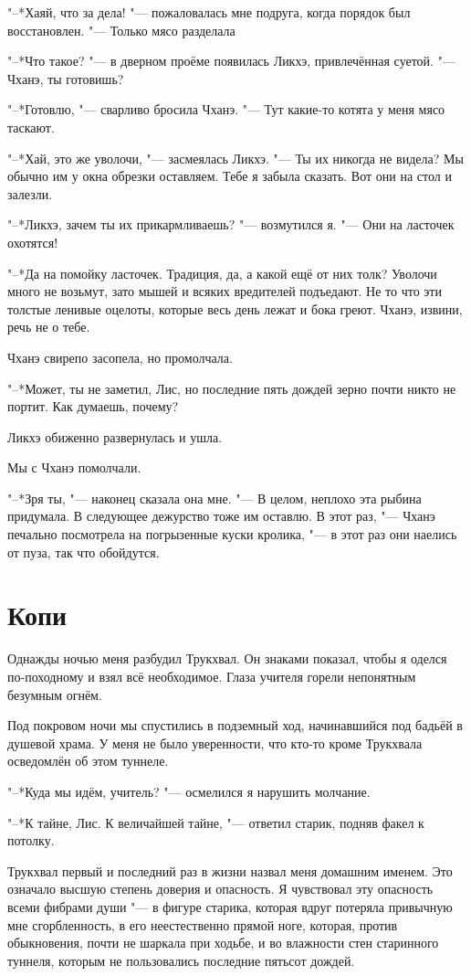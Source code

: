 \documentclass[a4paper,10pt]{book}
\newcommand{\ldotst}{\so{...}\xspace}
\newcommand{\ldotse}{\so{!..}\xspace}
\begin{document}
"--*Хаяй, что за дела! "--- пожаловалась мне подруга, когда порядок был 
восстановлен. "--- Только мясо разделала\ldotse

"--*Что такое? "--- в дверном проёме появилась Ликхэ, привлечённая суетой. "--- 
Чханэ, ты готовишь?

"--*Готовлю, "--- сварливо бросила Чханэ. "--- Тут какие-то котята у меня мясо 
таскают.

"--*Хай, это же уволочи, "--- засмеялась Ликхэ. "--- Ты их никогда не видела? 
Мы обычно им у окна обрезки оставляем. Тебе я забыла сказать. Вот они на стол и 
залезли.

"--*Ликхэ, зачем ты их прикармливаешь? "--- возмутился я. "--- Они на ласточек 
охотятся!

"--*Да на помойку ласточек. Традиция, да, а какой ещё от них толк? Уволочи 
много не возьмут, зато мышей и всяких вредителей подъедают. Не то что эти 
толстые ленивые оцелоты, которые весь день лежат и бока греют. Чханэ, извини, 
речь не о тебе.

Чханэ свирепо засопела, но промолчала.

"--*Может, ты не заметил, Лис, но последние пять дождей зерно почти никто не 
портит. Как думаешь, почему?

Ликхэ обиженно развернулась и ушла.

Мы с Чханэ помолчали.

"--*Зря ты, "--- наконец сказала она мне. "--- В целом, неплохо эта рыбина 
придумала. В следующее дежурство тоже им оставлю. В этот раз, "--- Чханэ 
печально посмотрела на погрызенные куски кролика, "--- в этот раз они наелись 
от пуза, так что обойдутся.
 
\section{Копи}
 
Однажды ночью меня разбудил Трукхвал. Он знаками показал, чтобы я оделся 
по-походному и взял всё необходимое. Глаза учителя горели непонятным безумным 
огнём.

Под покровом ночи мы спустились в подземный ход, начинавшийся под бадьёй в 
душевой храма. У меня не было уверенности, что кто-то кроме Трукхвала 
осведомлён об этом туннеле.

"--*Куда мы идём, учитель? "--- осмелился я нарушить молчание.

"--*К тайне, Лис. К величайшей тайне, "--- ответил старик, подняв факел к
потолку.

Трукхвал первый и последний раз в жизни назвал меня домашним именем. Это 
означало высшую степень доверия\ldotst и опасность. Я чувствовал эту опасность 
всеми фибрами души "--- в фигуре старика, которая вдруг потеряла привычную мне 
сгорбленность, в его неестественно прямой ноге, которая, против обыкновения, 
почти не шаркала при ходьбе, и во влажности стен старинного туннеля, которым не 
пользовались последние пятьсот дождей.
\end{document}
